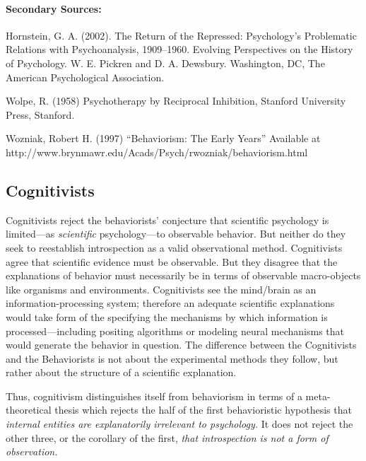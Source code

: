 \paragraph{Secondary Sources:}
\label{secondarysources:}

Hornstein, G. A. (2002). The Return of the Repressed: Psychology's Problematic Relations with Psychoanalysis, 1909--1960. Evolving Perspectives on the History of Psychology. W. E. Pickren and D. A. Dewsbury. Washington, DC, The American Psychological Association.

Wolpe, R. (1958) Psychotherapy by Reciprocal Inhibition, Stanford University Press, Stanford.

Wozniak, Robert H. (1997) ``Behaviorism: The Early Years'' Available at http:\slash \slash www.brynmawr.edu\slash Acads\slash Psych\slash rwozniak\slash behaviorism.html

\subsection{Cognitivists}
\label{cognitivists}

Cognitivists reject the behaviorists' conjecture that scientific psychology is limited---as \emph{scientific} psychology---to observable behavior. But neither do they seek to reestablish introspection as a valid observational method. Cognitivists agree that scientific evidence must be observable. But they disagree that the explanations of behavior must necessarily be in terms of observable macro-objects like organisms and environments. Cognitivists see the mind\slash brain as an information-processing system; therefore an adequate scientific explanations would take form of the specifying the mechanisms by which information is processed---including positing algorithms or modeling neural mechanisms that would generate the behavior in question. The difference between the Cognitivists and the Behaviorists is not about the experimental methods they follow, but rather about the structure of a scientific explanation.

Thus, cognitivism distinguishes itself from behaviorism in terms of a meta-theoretical thesis which rejects the half of the first behavioristic hypothesis that \emph{internal entities are explanatorily irrelevant to psychology.} It does not reject the other three, or the corollary of the first, \emph{that introspection is not a form of observation.}

